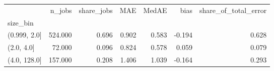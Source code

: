 \begin{tabular}{lrrrrrr}
\toprule
 & n_jobs & share_jobs & MAE & MedAE & bias & share_of_total_error \\
size_bin &  &  &  &  &  &  \\
\midrule
(0.999, 2.0] & 524.000 & 0.696 & 0.902 & 0.583 & -0.194 & 0.628 \\
(2.0, 4.0] & 72.000 & 0.096 & 0.824 & 0.578 & 0.059 & 0.079 \\
(4.0, 128.0] & 157.000 & 0.208 & 1.406 & 1.039 & -0.164 & 0.293 \\
\bottomrule
\end{tabular}
